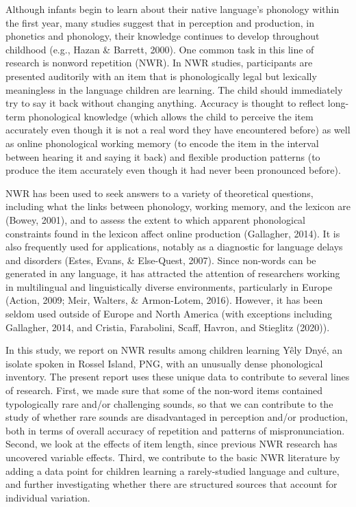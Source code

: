 \documentclass[english,,man,floatsintext]{apa6}
\begin{document}
Although infants begin to learn about their native language's phonology within the first year, many studies suggest that in perception and production, in phonetics and phonology, their knowledge continues to develop throughout childhood (e.g., Hazan \& Barrett, 2000). One common task in this line of research is nonword repetition (NWR). In NWR studies, participants are presented auditorily with an item that is phonologically legal but lexically meaningless in the language children are learning. The child should immediately try to say it back without changing anything. Accuracy is thought to reflect long-term phonological knowledge (which allows the child to perceive the item accurately even though it is not a real word they have encountered before) as well as online phonological working memory (to encode the item in the interval between hearing it and saying it back) and flexible production patterns (to produce the item accurately even though it had never been pronounced before).

NWR has been used to seek answers to a variety of theoretical questions, including what the links between phonology, working memory, and the lexicon are (Bowey, 2001), and to assess the extent to which apparent phonological constraints found in the lexicon affect online production (Gallagher, 2014). It is also frequently used for applications, notably as a diagnostic for language delays and disorders (Estes, Evans, \& Else-Quest, 2007). Since non-words can be generated in any language, it has attracted the attention of researchers working in multilingual and linguistically diverse environments, particularly in Europe (Action, 2009; Meir, Walters, \& Armon-Lotem, 2016). However, it has been seldom used outside of Europe and North America (with exceptions including Gallagher, 2014, and Cristia, Farabolini, Scaff, Havron, and Stieglitz (2020)).

In this study, we report on NWR results among children learning Yêly Dnyé, an isolate spoken in Rossel Island, PNG, with an unusually dense phonological inventory. The present report uses these unique data to contribute to several lines of research. First, we made sure that some of the non-word items contained typologically rare and/or challenging sounds, so that we can contribute to the study of whether rare sounds are disadvantaged in perception and/or production, both in terms of overall accuracy of repetition and patterns of mispronunciation. Second, we look at the effects of item length, since previous NWR research has uncovered variable effects. Third, we contribute to the basic NWR literature by adding a data point for children learning a rarely-studied language and culture, and further investigating whether there are structured sources that account for individual variation.
\end{document}
